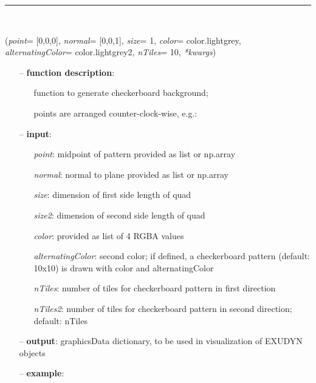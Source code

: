 \begin{itemize}[leftmargin=1.4cm]
\begin{itemize}[leftmargin=1.4cm]
\begin{itemize}[leftmargin=1.4cm]
\begin{itemize}[leftmargin=0.5cm]
\begin{itemize}[leftmargin=1.4cm]
\begin{itemize}[leftmargin=1.4cm]
\begin{itemize}[leftmargin=0.5cm]
\begin{itemize}[leftmargin=1.4cm]
%
\noindent\rule{8cm}{0.75pt}\vspace{1pt} \\ 
\begin{flushleft}
\label{sec:graphics:CheckerBoard}
({\it point}= [0,0,0], {\it normal}= [0,0,1], {\it size}= 1, {\it color}= color.lightgrey, {\it alternatingColor}= color.lightgrey2, {\it nTiles}= 10, {\it **kwargs})
\end{flushleft}
\setlength{\itemindent}{0.7cm}
\begin{itemize}[leftmargin=0.7cm]
\item[--]
{\bf function description}: \vspace{-6pt}
\begin{itemize}[leftmargin=1.2cm]
\setlength{\itemindent}{-0.7cm}
\item[]function to generate checkerboard background;
\item[]points are arranged counter-clock-wise, e.g.:
\end{itemize}
\item[--]
{\bf input}: \vspace{-6pt}
\begin{itemize}[leftmargin=1.2cm]
\setlength{\itemindent}{-0.7cm}
\item[]{\it point}: midpoint of pattern provided as list or np.array
\item[]{\it normal}: normal to plane provided as list or np.array
\item[]{\it size}: dimension of first side length of quad
\item[]{\it size2}: dimension of second side length of quad
\item[]{\it color}: provided as list of 4 RGBA values
\item[]{\it alternatingColor}: second color; if defined, a checkerboard pattern (default: 10x10) is drawn with color and alternatingColor
\item[]{\it nTiles}: number of tiles for checkerboard pattern in first direction
\item[]{\it nTiles2}: number of tiles for checkerboard pattern in second direction; default: nTiles
\end{itemize}
\item[--]
{\bf output}: graphicsData dictionary, to be used in visualization of EXUDYN objects
\item[--]
{\bf example}: \vspace{-12pt}\ei\begin{lstlisting}[language=Python, xleftmargin=36pt]

\end{lstlisting}
\end{itemize}
\end{itemize}
\end{itemize}
\end{itemize}
\end{itemize}
\end{itemize}
\end{itemize}
\end{itemize}
\end{itemize}

